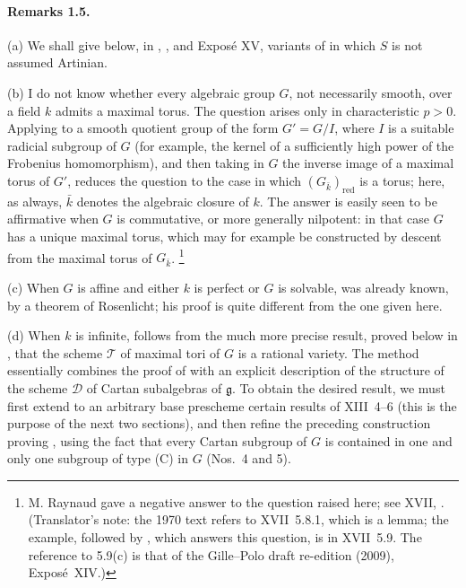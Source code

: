 \paragraph{\textbf{Remarks 1.5.}}
\textup{(a)} We shall give below, in , , and Exposé XV,
variants of  in which \(S\) is not assumed Artinian.

\medskip
\noindent\textup{(b)} I do not know whether every algebraic group
\(G\), not necessarily smooth, over a field \(k\) admits a maximal
torus. The question arises only in characteristic \(p>0\). Applying
 to a smooth quotient group of the form \(G'=G/I\), where \(I\)
is a suitable radicial subgroup of \(G\) \textup{(for example, the
kernel of a sufficiently high power of the Frobenius homomorphism)},
and then taking in \(G\) the inverse image of a maximal torus of
\(G'\), reduces the question to the case in which
\((G_{\bar k})_{\mathrm{red}}\) is a torus; here, as always,
\(\bar k\) denotes the algebraic closure of \(k\). The answer is
easily seen to be affirmative when \(G\) is commutative, or more
generally nilpotent: in that case \(G\) has a unique maximal torus,
which may for example be constructed by descent from the maximal
torus of \(G_{\bar k}\).\begingroup
\renewcommand{\thefootnote}{*}\footnote{M. Raynaud gave a negative
answer to the question raised here; see XVII, . (Translator's note: the 1970 text refers to XVII~5.8.1, which is a lemma; the example, followed by , which answers this question, is in XVII~5.9. The reference to 5.9(c) is that of the Gille--Polo draft re-edition (2009), Exposé~XIV.)}
\endgroup

\medskip
\noindent\textup{(c)} When \(G\) is affine and either \(k\) is
perfect or \(G\) is solvable,  was already known, by a theorem of
Rosenlicht; his proof is quite different from the one given here.

\medskip
\noindent\textup{(d)} When \(k\) is infinite,  follows from the
much more precise result, proved below in , that the scheme
\(\mathcal T\) of maximal tori of \(G\) is a rational variety. The
method essentially combines the proof of  with an explicit
description of the structure of the scheme \(\mathcal D\) of Cartan
subalgebras of \(\mathfrak g\). To obtain the desired result, we
must first extend to an arbitrary base prescheme certain results of
XIII~4--6 \textup{(this is the purpose of the next two sections)},
and then refine the preceding construction proving , using the
fact that every Cartan subgroup of \(G\) is contained in one and
only one subgroup of type \textup{(C)} in \(G\) \textup{(Nos.~4
and 5)}.

